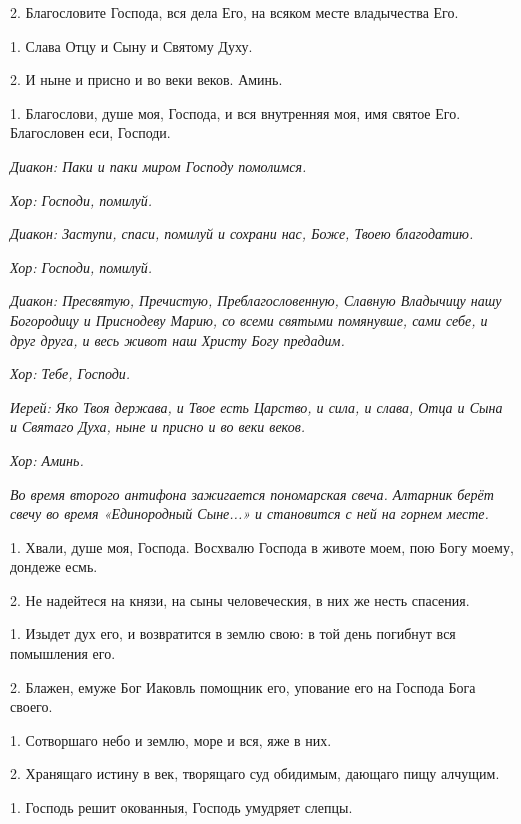 2. Благословите Господа, вся дела Его, на всяком месте владычества Его. 


1. Слава Отцу и Сыну и Святому Духу. 


2. И ныне и присно и во веки веков. Аминь. 


1. Благослови, душе моя, Господа, и вся внутренняя моя, имя святое Его. Благословен еси, Господи.




\medskip\itshape Диакон:\normalfont{} Паки и паки миром Господу помолимся. 


\itshape Хор:\normalfont{} Господи, помилуй. 


\itshape Диакон:\normalfont{} Заступи, спаси, помилуй и сохрани нас, Боже, Твоею благодатию. 


\itshape Хор:\normalfont{} Господи, помилуй. 


\itshape Диакон:\normalfont{} Пресвятую, Пречистую, Преблагословенную, Славную Владычицу нашу Богородицу и Приснодеву Марию, со всеми святыми помянувше, сами себе, и друг друга, и весь живот наш Христу Богу предадим. 


\itshape Хор:\normalfont{} Тебе, Господи. 


\itshape Иерей:\normalfont{} Яко Твоя держава, и Твое есть Царство, и сила, и слава, Отца и Сына и Святаго Духа, ныне и присно и во веки веков. 


\itshape Хор:\normalfont{} Аминь. 


\itshape Во время второго антифона зажигается пономарская свеча. Алтарник берёт свечу во время «Единородный Сыне...» и становится с ней на горнем месте.\normalfont{}




1. Хвали, душе моя, Господа. Восхвалю Господа в животе моем, пою Богу моему, дондеже есмь. 


2. Не надейтеся на князи, на сыны человеческия, в них же несть спасения. 


1. Изыдет дух его, и возвратится в землю свою: в той день погибнут вся помышления его. 


2. Блажен, емуже Бог Иаковль помощник его, упование его на Господа Бога своего. 


1. Сотворшаго небо и землю, море и вся, яже в них. 


2. Хранящаго истину в век, творящаго суд обидимым, дающаго пищу алчущим. 


1. Господь решит окованныя, Господь умудряет слепцы. 



